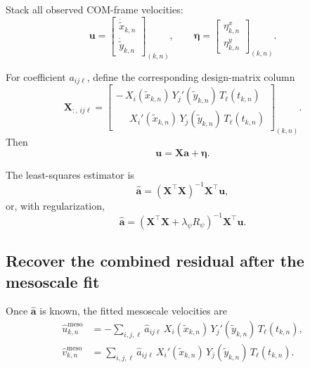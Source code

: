 Stack all observed COM-frame velocities:
\begin{equation}
\mathbf{u}=
\begin{bmatrix}
\dot{\tilde{x}}_{k,n}\\
\dot{\tilde{y}}_{k,n}
\end{bmatrix}_{(k,n)},
\qquad
\boldsymbol{\eta}=
\begin{bmatrix}
\eta^x_{k,n}\\
\eta^y_{k,n}
\end{bmatrix}_{(k,n)}.
\end{equation}

For coefficient $a_{ij\ell}$, define the corresponding design-matrix column
\begin{equation}
\mathbf{X}_{:,\,ij\ell}
=
\begin{bmatrix}
-\,X_i(\tilde{x}_{k,n})\,Y_j'(\tilde{y}_{k,n})\,T_\ell(t_{k,n})
\\[0.25em]
\phantom{-}\,X_i'(\tilde{x}_{k,n})\,Y_j(\tilde{y}_{k,n})\,T_\ell(t_{k,n})
\end{bmatrix}_{(k,n)}.
\label{eq:X_design_meso}
\end{equation}
Then
\begin{equation}
\mathbf{u}=\mathbf{X}\mathbf{a}+\boldsymbol{\eta}.
\label{eq:meso_regression}
\end{equation}

The least-squares estimator is
\begin{equation}
\hat{\mathbf{a}}
=
(\mathbf{X}^\top\mathbf{X})^{-1}\mathbf{X}^\top\mathbf{u},
\end{equation}
or, with regularization,
\begin{equation}
\hat{\mathbf{a}}
=
(\mathbf{X}^\top\mathbf{X}+\lambda_\psi R_\psi)^{-1}\mathbf{X}^\top\mathbf{u}.
\label{eq:meso_regression_regularized}
\end{equation}

\subsection{Recover the combined residual after the mesoscale fit}

Once $\hat{\mathbf{a}}$ is known, the fitted mesoscale velocities are
\begin{align}
\hat{u}^{\mathrm{meso}}_{k,n}
&=
-\sum_{i,j,\ell}
\hat{a}_{ij\ell}\,
X_i(\tilde{x}_{k,n})\,Y_j'(\tilde{y}_{k,n})\,T_\ell(t_{k,n}),
\\
\hat{v}^{\mathrm{meso}}_{k,n}
&=
\sum_{i,j,\ell}
\hat{a}_{ij\ell}\,
X_i'(\tilde{x}_{k,n})\,Y_j(\tilde{y}_{k,n})\,T_\ell(t_{k,n}).
\end{align}

